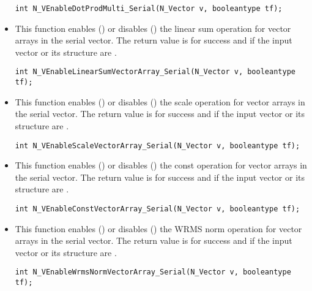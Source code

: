 \begin{itemize}
\verb|int N_VEnableDotProdMulti_Serial(N_Vector v, booleantype tf);|


\item {}

This function enables () or disables () the linear sum
operation for vector arrays in the serial vector. The return value is  for
success and  if the input vector or its  structure are .

\verb|int N_VEnableLinearSumVectorArray_Serial(N_Vector v, booleantype tf);|


\item {}

This function enables () or disables () the scale
operation for vector arrays in the serial vector. The return value is  for
success and  if the input vector or its  structure are .

\verb|int N_VEnableScaleVectorArray_Serial(N_Vector v, booleantype tf);|


\item {}

This function enables () or disables () the const
operation for vector arrays in the serial vector. The return value is  for
success and  if the input vector or its  structure are .

\verb|int N_VEnableConstVectorArray_Serial(N_Vector v, booleantype tf);|


\item {}

This function enables () or disables () the WRMS norm
operation for vector arrays in the serial vector. The return value is  for
success and  if the input vector or its  structure are .

\verb|int N_VEnableWrmsNormVectorArray_Serial(N_Vector v, booleantype tf);|



\end{itemize}
